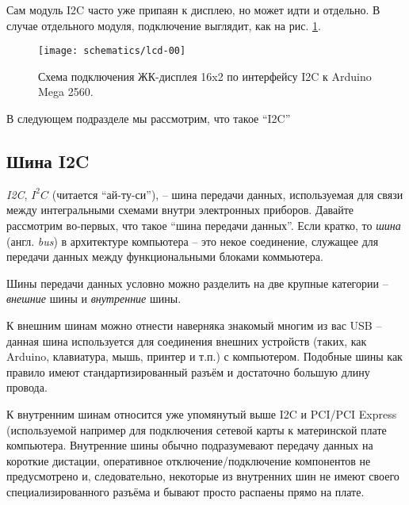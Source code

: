 \documentclass[../sparc.tex]{subfiles}
\begin{document}
Сам модуль I2C часто уже припаян к дисплею, но может идти и отдельно.  В случае
отдельного модуля, подключение выглядит, как на рис. \ref{fig:lcd-00}.

\begin{figure}[ht]
  \centering
  \texttt{[image: schematics/lcd-00]}
  \caption{Схема подключения ЖК-дисплея 16x2 по интерфейсу I2C к Arduino Mega
    2560.}
  \label{fig:lcd-00}
\end{figure}

В следующем подразделе мы рассмотрим, что такое ``I2C''

\subsection{Шина I2C \Star}


\textit{\gls{I2C}}, $I^{2}C$ (читается ``ай-ту-си''), -- шина передачи данных,
используемая для связи между интегральными схемами внутри электронных приборов.
Давайте рассмотрим во-первых, что такое ``шина передачи данных''.  Если кратко,
то \textit{шина} (англ. \textit{bus}) в архитектуре компьютера -- это некое
соединение, служащее для передачи данных между функциональными блоками
коммьютера.

Шины передачи данных условно можно разделить на две крупные категории --
\textit{внешние} шины и \textit{внутренние} шины.

К внешним шинам можно отнести наверняка знакомый многим из вас \gls{USB} --
данная шина используется для соединения внешних устройств (таких, как Arduino,
клавиатура, мышь, принтер и т.п.) с компьютером.  Подобные шины как правило
имеют стандартизированный разъём и достаточно большую длину провода.

К внутренним шинам относится уже упомянутый выше \gls{I2C} и \gls{PCI}/PCI
Express (используемой например для подключения сетевой карты к материнской плате
компьютера.  Внутренние шины обычно подразумевают передачу данных на короткие
дистации, оперативное отключение/подключение компонентов не предусмотрено и,
следовательно, некоторые из внутренних шин не имеют своего специализированного
разъёма и бывают просто распаены прямо на плате.
\end{document}
